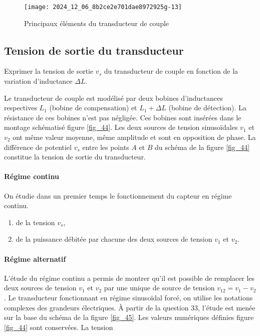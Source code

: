 \begin{figure}[!htb]
\begin{center}
\texttt{[image: 2024\_12\_06\_8b2ce2e701dae8972925g-13]}
\caption{Principaux éléments du transducteur de couple \label{fig_43}}
\end{center}
\end{figure}


\subsection{Tension de sortie du transducteur}

\begin{obj}
Exprimer la tension de sortie  $v_{s}$ du transducteur de couple en fonction de la variation d'inductance  $\Delta L$.
\end{obj}

Le transducteur de couple est modélisé par deux bobines d'inductances respectives \(L_{1}\) (bobine de compensation) et \(L_{1}+\Delta L\) (bobine de détection). La résistance de ces bobines n'est pas négligée. Ces bobines sont insérées dans le montage schématisé figure \ref{fig_44}. Les deux sources de tension sinusoïdales \(v_{1}\) et \(v_{2}\) ont même valeur moyenne, même amplitude et sont en opposition de phase. La différence de potentiel \(v_{s}\) entre les points \(A\) et \(B\) du schéma de la figure \ref{fig_44} constitue la tension de sortie du transducteur.

\paragraph*{Régime continu}
On étudie dans un premier temps le fonctionnement du capteur en régime continu.


\begin{enumerate}
  \item de la tension \(v_{s}\),
  \item de la puissance débitée par chacune des deux sources de tension \(v_{1}\) et \(v_{2}\).
\end{enumerate}
\ifprof
\begin{corrige}

\end{corrige}
\else
\fi

\paragraph*{Régime alternatif} L'étude du régime continu a permis de montrer qu'il est possible de remplacer les deux sources de tension \(v_{1}\) et \(v_{2}\) par une unique de source de tension \(v_{12}=v_{1}-v_{2}\). Le transducteur fonctionnant en régime sinusoïdal forcé, on utilise les notations complexes des grandeurs électriques. À partir de la question 33, l'étude est menée sur la base du schéma de la figure \ref{fig_45}. Les valeurs numériques définies figure \ref{fig_44} sont conservées. La tension


